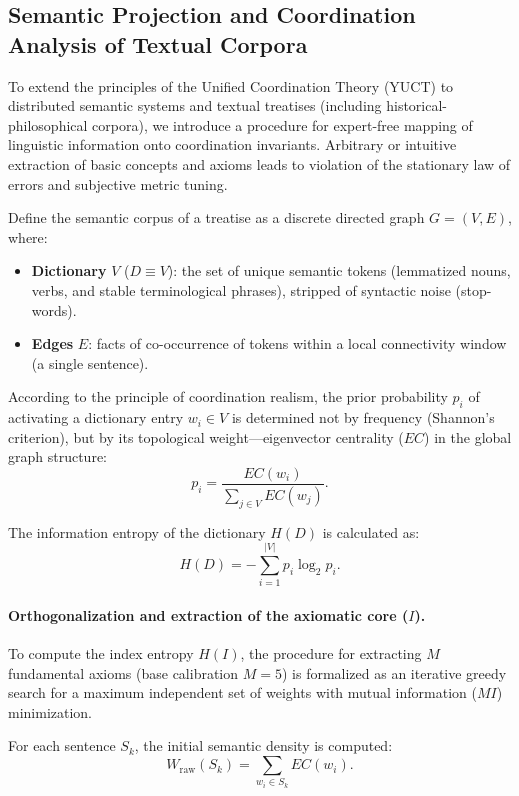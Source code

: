 \documentclass[12pt,a4paper]{article}
\begin{document}
	\subsection{Semantic Projection and Coordination Analysis of Textual Corpora}
	\label{subsec:semantic-projection}
	
	To extend the principles of the Unified Coordination Theory (YUCT) to distributed semantic systems and textual treatises (including historical-philosophical corpora), we introduce a procedure for expert-free mapping of linguistic information onto coordination invariants. Arbitrary or intuitive extraction of basic concepts and axioms leads to violation of the stationary law of errors and subjective metric tuning.
	
	Define the semantic corpus of a treatise as a discrete directed graph \(G = (V, E)\), where:
	\begin{itemize}
		\item \textbf{Dictionary} \(V\) (\(D \equiv V\)): the set of unique semantic tokens (lemmatized nouns, verbs, and stable terminological phrases), stripped of syntactic noise (stop-words).
		\item \textbf{Edges} \(E\): facts of co-occurrence of tokens within a local connectivity window (a single sentence).
	\end{itemize}
	
	According to the principle of coordination realism, the prior probability \(p_i\) of activating a dictionary entry \(w_i \in V\) is determined not by frequency (Shannon's criterion), but by its topological weight—eigenvector centrality (\(EC\)) in the global graph structure:
	\[
	p_{i} = \frac{EC(w_{i})}{\sum_{j \in V} EC(w_{j})}.
	\]
	
	The information entropy of the dictionary \(H(D)\) is calculated as:
	\[
	H(D) = -\sum_{i=1}^{|V|} p_{i} \log_{2} p_{i}.
	\]
	
	\paragraph{Orthogonalization and extraction of the axiomatic core (\(I\)).}
	To compute the index entropy \(H(I)\), the procedure for extracting \(M\) fundamental axioms (base calibration \(M = 5\)) is formalized as an iterative greedy search for a maximum independent set of weights with mutual information (\(MI\)) minimization.
	
	For each sentence \(S_{k}\), the initial semantic density is computed:
	\[
	W_{\text{raw}}(S_k) = \sum_{w_i \in S_k} EC(w_i).
	\]
	
\end{document}
